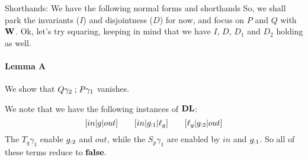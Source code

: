 Shorthands:
We have the following normal forms and shorthands
So, we shall park the invariants ($I$) and disjointness ($D$) for now,
and focus on $P$ and $Q$ with $\mathbf{W}$.
Ok, let's try squaring, keeping in mind that we have $I$, $D$, $D_1$
and $D_2$ holding as well.


\paragraph{Lemma A}
We show that $Q\gamma_2\mathrel{;} P\gamma_1$ vanishes.

We note that we have the following instances of $\mathbf{DL}$:
\[
  [in|g|out] \qquad [in|g_{:1}|\ell_g] \qquad [\ell_g|g_{:2}|out]
\]
The $T_q\gamma_1$ enable $g_{:2}$ and $out$,
while the $S_p\gamma_1$ are enabled by $in$ and $g_{:1}$.
So all of these terms reduce to $\mathbf{false}.$

